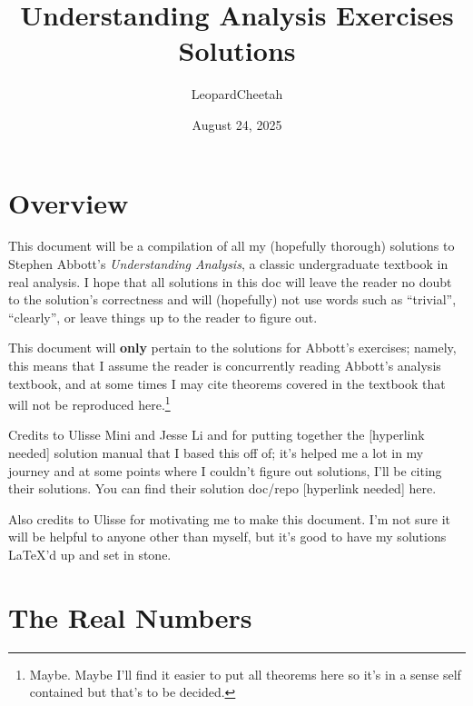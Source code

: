 \documentclass[12pt]{article}
\title{Understanding Analysis Exercises Solutions}
\author{LeopardCheetah}
\date{August 24, 2025}
\theoremstyle{definition}
\begin{document}
 
\maketitle
\newpage


\section*{Overview}

This document will be a compilation of all my (hopefully thorough) solutions to Stephen Abbott's \textit{Understanding Analysis}, a classic undergraduate textbook in real analysis. I hope that all solutions in this doc will leave the reader no doubt to the solution's correctness and will (hopefully) not use words such as ``trivial'', ``clearly'', or leave things up to the reader to figure out.

This document will \textbf{only} pertain to the solutions for Abbott's exercises; namely, this means that I assume the reader is concurrently reading Abbott's analysis textbook, and at some times I may cite theorems covered in the textbook that will not be reproduced here.\footnote{Maybe. Maybe I'll find it easier to put all theorems here so it's in a sense self contained but that's to be decided.}

Credits to Ulisse Mini and Jesse Li and for putting together the [hyperlink needed] solution manual that I based this off of; it's helped me a lot in my journey and at some points where I couldn't figure out solutions, I'll be citing their solutions. You can find their solution doc/repo [hyperlink needed] here.

Also credits to Ulisse for motivating me to make this document. I'm not sure it will be helpful to anyone other than myself, but it's good to have my solutions \LaTeX'd up and set in stone.

\newpage


\tableofcontents
\newpage 




\section{The Real Numbers}
\end{document}
